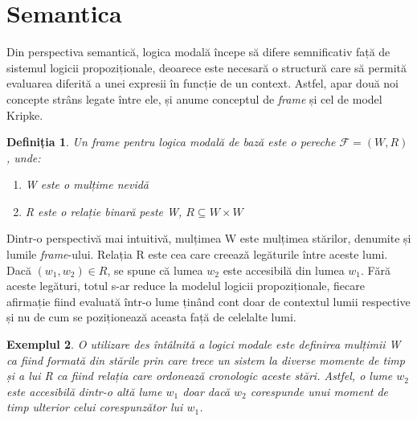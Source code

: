 \documentclass[12pt, openany]{book}
\newtheorem{definition}{Definiția}[chapter] %
\newtheorem{example}[definition]{Exemplul} %
\begin{document}
        \section{Semantica}
        \label{section_semantics}
            \par{}
                Din perspectiva semantică, logica modală începe să difere semnificativ 
                față de sistemul logicii propoziționale, deoarece este necesară o structură care să permită 
                evaluarea diferită a unei expresii în funcție de un context. Astfel, apar două noi concepte strâns 
                legate între ele, și anume conceptul de \textit{frame} și cel de model Kripke.
            
            \begin{definition}
                Un \textit{frame} pentru logica modală de bază este o pereche $\mathcal{F} = (W, R)$, unde:
                \begin{enumerate}
                    \item W este o mulțime nevidă
                    \item R este o relație binară peste W, $R \subseteq W \times W$
                \end{enumerate}
            \end{definition}

            \par{}
                Dintr-o perspectivă mai intuitivă, mulțimea W este mulțimea stărilor, denumite și lumile \textit{frame}-ului. 
                Relația R este cea care creează legăturile între aceste lumi. Dacă $(w_1, w_2) \in R$, se spune că lumea $w_2$ 
                este accesibilă din lumea $w_1$. Fără aceste legături, totul s-ar reduce la modelul logicii propoziționale, 
                fiecare afirmație fiind evaluată într-o lume ținând cont doar de contextul lumii respective și nu de cum se 
                poziționează aceasta față de celelalte lumi. 
            
            \begin{example}
                O utilizare des întâlnită a logici modale este definirea mulțimii W ca fiind formată din stările 
                prin care trece un sistem la diverse momente de timp și a lui R ca fiind relația care ordonează 
                cronologic aceste stări. Astfel, o lume $w_2$ este accesibilă dintr-o altă lume $w_1$ doar dacă 
                $w_2$ corespunde unui moment de timp ulterior celui corespunzător lui $w_1$.
            \end{example}
            
\end{document}
